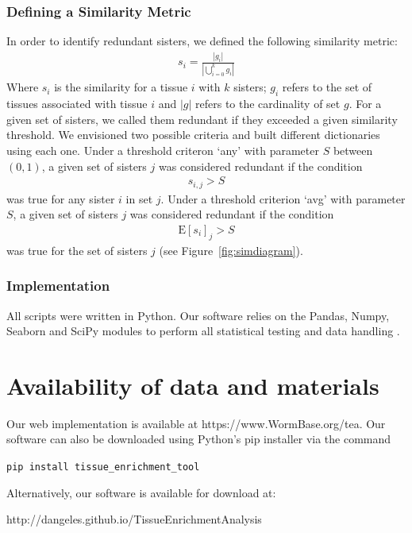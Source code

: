 \documentclass{bmcart}
\begin{document}
\subsubsection*{Defining a Similarity Metric}
In order to identify redundant sisters, we defined the following similarity metric:
\begin{eqnarray}\label{similarity def}
	s_i = \frac{|g_i|}{|\bigcup_{i= 0}^k g_i|}
\end{eqnarray}
Where $s_i$ is the similarity for a tissue $i$ with $k$ sisters; $g_i$ refers to the set of tissues associated with tissue $i$ and $|g|$ refers to the cardinality of set $g$. For a given set of sisters, we called them redundant if they exceeded a given similarity threshold. We envisioned two possible criteria and built different dictionaries using each one. Under a threshold criteron `any' with parameter $S$ between $(0, 1)$, a given set of sisters $j$ was considered redundant if the condition
\begin{eqnarray}\label{any threshold}
	s_{i, j} > S
\end{eqnarray}
was true for any sister $i$ in set $j$. Under a threshold criterion `avg' with parameter $S$, a given set of sisters $j$ was considered redundant if the condition
\begin{eqnarray}\label{avg threshold}
	\mathrm{E}[s_i]_j > S
\end{eqnarray}
was true for the set of sisters $j$ (see Figure~\ref{fig:simdiagram}).

\subsubsection*{Implementation}
All scripts were written in Python. Our software relies on the Pandas, Numpy, Seaborn and SciPy modules to perform all statistical testing and data handling \cite{McKinney2011, VanDerWalt2011, Oliphant2007}.


\section*{Availability of data and materials}
Our web implementation is available at https://www.WormBase.org/tea. Our software can also be downloaded using Python's pip installer via the command

\texttt{pip install tissue\_enrichment\_tool}

Alternatively, our software is available for download at:

http://dangeles.github.io/TissueEnrichmentAnalysis
\end{document}
